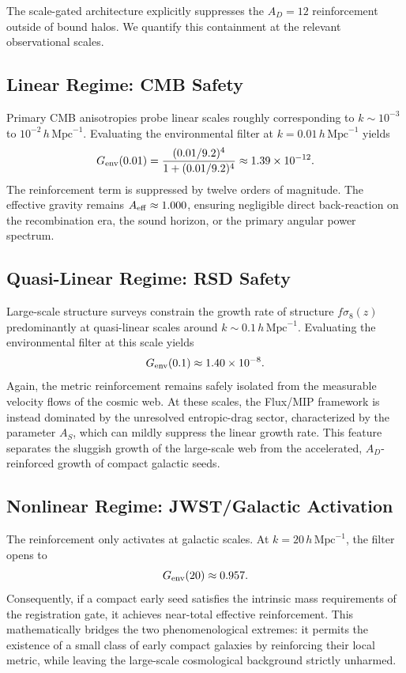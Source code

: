 \documentclass[11pt,a4paper]{article}
\begin{document}
The scale-gated architecture explicitly suppresses the $A_D=12$ reinforcement outside of bound halos. We quantify this containment at the relevant observational scales.

\subsection{Linear Regime: CMB Safety}

Primary CMB anisotropies probe linear scales roughly corresponding to $k\sim10^{-3}$ to $10^{-2}\,h\,\mathrm{Mpc}^{-1}$. Evaluating the environmental filter at $k=0.01\,h\,\mathrm{Mpc}^{-1}$ yields
\begin{equation}
G_{\rm env}(0.01)=\frac{(0.01/9.2)^4}{1+(0.01/9.2)^4}\approx1.39\times10^{-12}.
\end{equation}
The reinforcement term is suppressed by twelve orders of magnitude. The effective gravity remains $A_{\rm eff}\approx1.000$, ensuring negligible direct back-reaction on the recombination era, the sound horizon, or the primary angular power spectrum.

\subsection{Quasi-Linear Regime: RSD Safety}

Large-scale structure surveys constrain the growth rate of structure $f\sigma_8(z)$ predominantly at quasi-linear scales around $k\sim0.1\,h\,\mathrm{Mpc}^{-1}$. Evaluating the environmental filter at this scale yields
\begin{equation}
G_{\rm env}(0.1)\approx1.40\times10^{-8}.
\end{equation}
Again, the metric reinforcement remains safely isolated from the measurable velocity flows of the cosmic web. At these scales, the Flux/MIP framework is instead dominated by the unresolved entropic-drag sector, characterized by the parameter $A_S$, which can mildly suppress the linear growth rate. This feature separates the sluggish growth of the large-scale web from the accelerated, $A_D$-reinforced growth of compact galactic seeds.

\subsection{Nonlinear Regime: JWST/Galactic Activation}

The reinforcement only activates at galactic scales. At $k=20\,h\,\mathrm{Mpc}^{-1}$, the filter opens to
\begin{equation}
G_{\rm env}(20)\approx0.957.
\end{equation}
Consequently, if a compact early seed satisfies the intrinsic mass requirements of the registration gate, it achieves near-total effective reinforcement. This mathematically bridges the two phenomenological extremes: it permits the existence of a small class of early compact galaxies by reinforcing their local metric, while leaving the large-scale cosmological background strictly unharmed.
\end{document}
